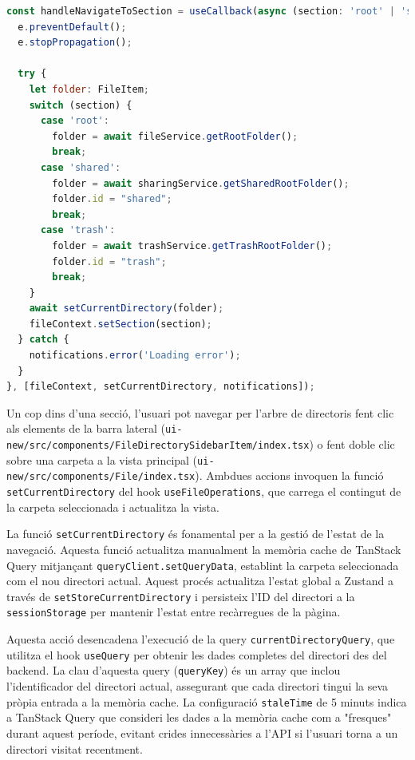 \begin{lstlisting}[language=javascript, caption={Navegació entre seccions a `FileDirectorySidebar/index.tsx`}]
const handleNavigateToSection = useCallback(async (section: 'root' | 'shared' | 'trash', e: React.MouseEvent) => {
  e.preventDefault();
  e.stopPropagation();

  try {
    let folder: FileItem;
    switch (section) {
      case 'root':
        folder = await fileService.getRootFolder();
        break;
      case 'shared':
        folder = await sharingService.getSharedRootFolder();
        folder.id = "shared";
        break;
      case 'trash':
        folder = await trashService.getTrashRootFolder();
        folder.id = "trash";
        break;
    }
    await setCurrentDirectory(folder);
    fileContext.setSection(section);
  } catch {
    notifications.error('Loading error');
  }
}, [fileContext, setCurrentDirectory, notifications]);
\end{lstlisting}

Un cop dins d'una secció, l'usuari pot navegar per l'arbre de directoris fent clic als elements de la barra lateral (\texttt{ui-new/src/components/FileDirectorySidebarItem/index.tsx}) o fent doble clic sobre una carpeta a la vista principal (\texttt{ui-new/src/components/File/index.tsx}). Ambdues accions invoquen la funció \texttt{setCurrentDirectory} del hook \texttt{useFileOperations}, que carrega el contingut de la carpeta seleccionada i actualitza la vista.

La funció \texttt{setCurrentDirectory} és fonamental per a la gestió de l'estat de la navegació. Aquesta funció actualitza manualment la memòria cache de TanStack Query mitjançant \texttt{queryClient.setQueryData}, establint la carpeta seleccionada com el nou directori actual. Aquest procés actualitza l'estat global a Zustand a través de \texttt{setStoreCurrentDirectory} i persisteix l'ID del directori a la \texttt{sessionStorage} per mantenir l'estat entre recàrregues de la pàgina.

Aquesta acció desencadena l'execució de la query \texttt{currentDirectoryQuery}, que utilitza el hook \texttt{useQuery} per obtenir les dades completes del directori des del backend. La clau d'aquesta query (\texttt{queryKey}) és un array que inclou l'identificador del directori actual, assegurant que cada directori tingui la seva pròpia entrada a la memòria cache. La configuració \texttt{staleTime} de 5 minuts indica a TanStack Query que consideri les dades a la memòria cache com a "fresques" durant aquest període, evitant crides innecessàries a l'API si l'usuari torna a un directori visitat recentment.

